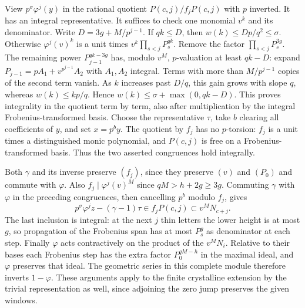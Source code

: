 View $p^\sigma\varphi^j(y)$ in the rational quotient
$P(c,j)/f_j P(c,j)$ with $p$ inverted. It has an integral
representative. It suffices to check one monomial $v^k$ and its
denominator. Write $D=3g+M/p^{j-1}$. If $qk\le D$, then
$w(k)\le Dp/q^2\le\sigma$. Otherwise
$\varphi^j(v)^k$ is a unit times
$v^k\prod_{s<j}P_s^{qk}$. Remove the factor $\prod_{s<j}P_s^{3g}$.
The remaining power $P_{j-1}^{qk-3g}$ has, modulo $v^M$,
$p$-valuation at least $qk-D$: expand
$P_{j-1}=pA_1+v^{p^{j-1}}A_2$ with $A_1,A_2$ integral.
Terms with more than $M/p^{j-1}$ copies of the second term
vanish. As $k$ increases past $D/q$, this gain grows with
slope $q$, whereas $w(k)\le kp/q$. Hence
$w(k)\le\sigma+\max(0,qk-D)$. This proves integrality in the
quotient term by term, also after multiplication by the integral
Frobenius-transformed basis. Choose the representative $\tau$,
take $b$ clearing all coefficients of $y$, and set $x=p^by$.
The quotient by $f_j$ has no $p$-torsion: $f_j$ is a unit times
a distinguished monic polynomial, and $P(c,j)$ is free on a
Frobenius-transformed basis. Thus the two asserted congruences
hold integrally.

Both $\gamma$ and its inverse preserve $(f_j)$, since they preserve
$(v)$ and $(P_0)$ and commute with $\varphi$. Also
$f_j\mid\varphi^j(v)^M$ since $qM>h+2g\ge3g$.
Commuting $\gamma$ with $\varphi$ in the preceding congruences,
then cancelling $p^b$ modulo $f_j$, gives
\[
 p^\sigma\varphi^j z-(\gamma-1)\tau\in f_jP(c,j)
                                      \subset v^M N_{c+j}.
\]
The last inclusion is integral: at the next $j$ thin letters
the lower height is at most $g$, so propagation of the
Frobenius span has at most $P_s^g$ as denominator at each step.
Finally $\varphi$ acts contractively on the product of the
$v^MN_i$. Relative to their bases each Frobenius step has the
extra factor $P_0^{qM-h}$ in the maximal ideal, and $\varphi$
preserves that ideal. The geometric series in this complete
module therefore inverts $1-\varphi$. These arguments apply to
the finite crystalline extension by the trivial representation as
well, since adjoining the zero jump preserves the given windows.

